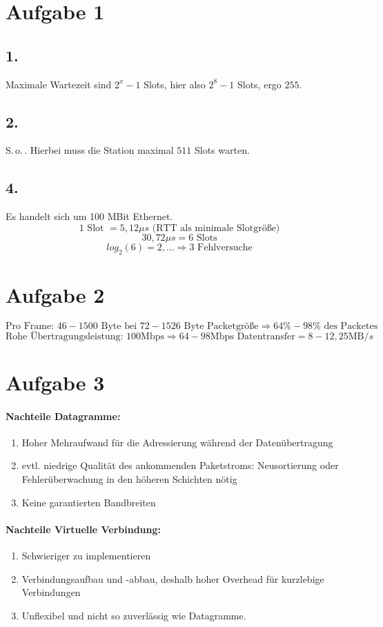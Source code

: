 \section{Aufgabe 1}

\subsection{1.}
Maximale Wartezeit sind $2^{x}-1$ Slots, hier also $2^8-1$ Slots, ergo $255$.

\subsection{2.}
S.\,o.\,. Hierbei muss die Station maximal $511$ Slots warten.

\subsection{4.}
Es handelt sich um 100 MBit Ethernet.
\[ 
    1 \text{ Slot } = 5,12 \mu s \text{ (RTT als minimale Slotgröße)}
\]
\[ 
    30,72 \mu s = 6 \text{ Slots}
\]
\[  
    log_2(6) = 2,\ldots \Rightarrow 3 \text{ Fehlversuche}
\]


\section{Aufgabe 2}

\[
    \text{Pro Frame: } 46-1500 \text{ Byte bei } 72 - 1526 \text{ Byte
    Packetgröße} \Rightarrow 64\% - 98\% \text{ des Packetes}
\]
\[
    \text{Rohe Übertragungsleistung: } 100\text{Mbps} \Rightarrow
    64-98\text{Mbps Datentransfer} = 8-12,25\text{MB}/s
\]

\section{Aufgabe 3}

\paragraph{Nachteile Datagramme:}
\begin{enumerate}
\item Hoher Mehraufwand für die Adressierung während der Datenübertragung
\item evtl. niedrige Qualität des ankommenden Paketstroms:  Neusortierung oder Fehlerüberwachung in den höheren Schichten nötig
\item Keine garantierten Bandbreiten
\end{enumerate}

\paragraph{Nachteile Virtuelle Verbindung:}
\begin{enumerate}
\item Schwieriger zu implementieren
\item Verbindungsaufbau und -abbau, deshalb hoher Overhead für kurzlebige Verbindungen
\item Unflexibel und nicht so zuverlässig wie Datagramme.
\end{enumerate}